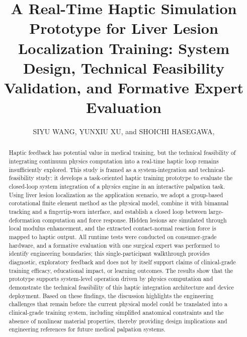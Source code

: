 \documentclass{ieeeaccess}
\begin{document}

\title{A Real-Time Haptic Simulation Prototype for Liver Lesion Localization Training: System Design, Technical Feasibility Validation, and Formative Expert Evaluation}
\author{\uppercase{Siyu Wang},
\uppercase{Yunxiu Xu},
and \uppercase{Shoichi Hasegawa}, }
\address[1]{Department of Information and Communication Engineering, Institute of Science Tokyo, Yokohama, Japan (e-mail: siw131@haselab.net, yunxiu@haselab.net, hasevr@haselab.net)}

\begin{abstract}
Haptic feedback has potential value in medical training, but the technical feasibility of integrating continuum physics computation into a real-time haptic loop remains insufficiently explored. This study is framed as a system-integration and technical-feasibility study: it develops a task-oriented haptic training prototype to evaluate the closed-loop system integration of a physics engine in an interactive palpation task. Using liver lesion localization as the application scenario, we adopt a group-based corotational finite element method as the physical model, combine it with bimanual tracking and a fingertip-worn interface, and establish a closed loop between large-deformation computation and force response. Hidden lesions are simulated through local modulus enhancement, and the extracted contact-normal reaction force is mapped to haptic output. All runtime tests were conducted on consumer-grade hardware, and a formative evaluation with one surgical expert was performed to identify engineering boundaries; this single-participant walkthrough provides diagnostic, exploratory feedback and does not by itself support claims of clinical-grade training efficacy, educational impact, or learning outcomes. The results show that the prototype supports system-level operation driven by physics computation and demonstrate the technical feasibility of this haptic integration architecture and device deployment. Based on these findings, the discussion highlights the engineering challenges that remain before the current physical model could be translated into a clinical-grade training system, including simplified anatomical constraints and the absence of nonlinear material properties, thereby providing design implications and engineering references for future medical palpation systems.
\end{abstract}
\end{document}
